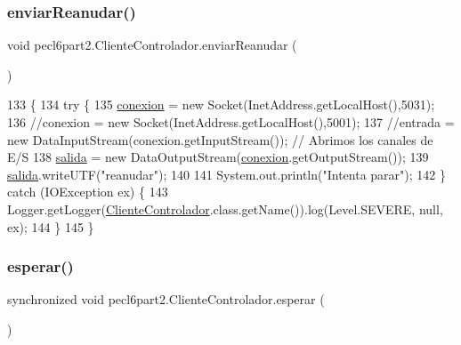 \subsubsection{\texorpdfstring{enviar\+Reanudar()}{enviarReanudar()}}
{\footnotesize\ttfamily void pecl6part2.\+Cliente\+Controlador.\+enviar\+Reanudar (\begin{DoxyParamCaption}{ }\end{DoxyParamCaption})\hspace{0.3cm}{\ttfamily [inline]}}


\begin{DoxyCode}
133         \{
134             \textcolor{keywordflow}{try} \{
135                 \mbox{\hyperlink{classpecl6part2_1_1_cliente_controlador_a4882463501ccc3555c15225ea3076745}{conexion}} = \textcolor{keyword}{new} Socket(InetAddress.getLocalHost(),5031);
136                 \textcolor{comment}{//conexion = new Socket(InetAddress.getLocalHost(),5001);}
137                 \textcolor{comment}{//entrada = new DataInputStream(conexion.getInputStream());  // Abrimos los canales de E/S}
138                 \mbox{\hyperlink{classpecl6part2_1_1_cliente_controlador_a05461ea286f84b5f3f8b82641a5d23af}{salida}}  = \textcolor{keyword}{new} DataOutputStream(\mbox{\hyperlink{classpecl6part2_1_1_cliente_controlador_a4882463501ccc3555c15225ea3076745}{conexion}}.getOutputStream());
139                 \mbox{\hyperlink{classpecl6part2_1_1_cliente_controlador_a05461ea286f84b5f3f8b82641a5d23af}{salida}}.writeUTF(\textcolor{stringliteral}{"reanudar"});
140                 
141                 System.out.println(\textcolor{stringliteral}{"Intenta parar"});
142             \} \textcolor{keywordflow}{catch} (IOException ex) \{
143                 Logger.getLogger(\mbox{\hyperlink{classpecl6part2_1_1_cliente_controlador_a6e526681bd2137858bfb2940eeb23cc8}{ClienteControlador}}.class.getName()).log(Level.SEVERE, 
      null, ex);
144             \}
145         \}
\end{DoxyCode}
\mbox{\label{classpecl6part2_1_1_cliente_controlador_af39e4985e3ba35a96c459f1713fa389a}} 
\subsubsection{\texorpdfstring{esperar()}{esperar()}}
{\footnotesize\ttfamily synchronized void pecl6part2.\+Cliente\+Controlador.\+esperar (\begin{DoxyParamCaption}{ }\end{DoxyParamCaption})\hspace{0.3cm}{\ttfamily [inline]}}



